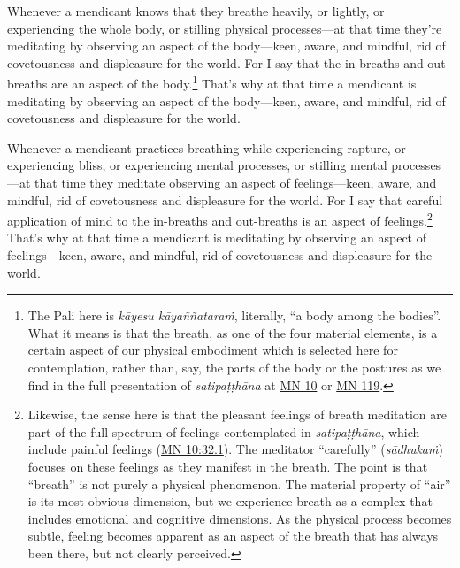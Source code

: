 \documentclass[12pt,openany]{book}%
\begin{document}
Whenever a mendicant knows that they breathe heavily, or lightly, or experiencing the whole body, or stilling physical processes—at that time they’re meditating by observing an aspect of the body—keen, aware, and mindful, rid of covetousness and displeasure for the world. For I say that the in-breaths and out-breaths are an aspect of the body.\footnote{The Pali here is \textit{\textsanskrit{kāyesu} \textsanskrit{kāyaññataraṁ}}, literally, “a body among the bodies”. What it means is that the breath, as one of the four material elements, is a certain aspect of our physical embodiment which is selected here for contemplation, rather than, say, the parts of the body or the postures as we find in the full presentation of \textit{\textsanskrit{satipaṭṭhāna}} at \href{https://suttacentral.net/mn10/en/sujato}{MN 10} or \href{https://suttacentral.net/mn119/en/sujato}{MN 119}. } That’s why at that time a mendicant is meditating by observing an aspect of the body—keen, aware, and mindful, rid of covetousness and displeasure for the world. 

Whenever a mendicant practices breathing while experiencing rapture, or experiencing bliss, or experiencing mental processes, or stilling mental processes—at that time they meditate observing an aspect of feelings—keen, aware, and mindful, rid of covetousness and displeasure for the world. For I say that careful application of mind to the in-breaths and out-breaths is an aspect of feelings.\footnote{Likewise, the sense here is that the pleasant feelings of breath meditation are part of the full spectrum of feelings contemplated in \textit{\textsanskrit{satipaṭṭhāna}}, which include painful feelings (\href{https://suttacentral.net/mn10/en/sujato\#32.1}{MN 10:32.1}). The meditator “carefully” (\textit{\textsanskrit{sādhukaṁ}}) focuses on these feelings as they manifest in the breath. The point is that “breath” is not purely a physical phenomenon. The material property of “air” is its most obvious dimension, but we experience breath as a complex that includes emotional and cognitive dimensions. As the physical process becomes subtle, feeling becomes apparent as an aspect of the breath that has always been there, but not clearly perceived. } That’s why at that time a mendicant is meditating by observing an aspect of feelings—keen, aware, and mindful, rid of covetousness and displeasure for the world. 
\end{document}
